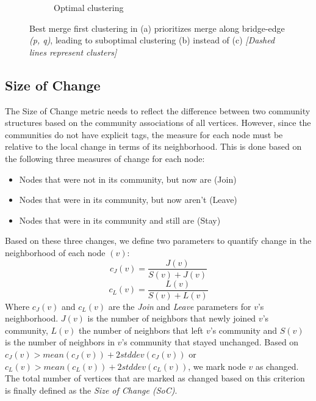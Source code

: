 \documentclass[conference]{IEEEtran}
\begin{document}
\begin{figure}
\begin{subfigure}{0.45\textwidth}
\caption{Optimal clustering} \label{wheel10o}
\end{subfigure}
\caption{\label{wheel10} Best merge first clustering in (a) prioritizes merge 
along bridge-edge \emph{(p, q)}, leading to suboptimal clustering (b) instead of 
(c) \emph{[Dashed lines represent clusters]}\vspace{-0.5cm}}
\end{figure}
\subsection{Size of Change}
The Size of Change metric needs to reflect the difference between two
 community structures based on the community associations of all vertices. 
However, since the communities do not have explicit tags, the measure for each 
node must be relative to the local change in terms of its neighborhood. This is 
done based on the following three measures of change for each node:
\begin{itemize}
 \item Nodes that were not in its community, but now are (Join)
 \item Nodes that were in its community, but now aren't (Leave)
 \item Nodes that were in its community and still are (Stay)
\end{itemize}
Based on these three changes, we define two parameters to quantify change in
the neighborhood of each node $(v)$:
\[c_J(v) = \frac{J(v)}{S(v) + J(v)}\]
\[c_L(v) = \frac{L(v)}{S(v) + L(v)}\]
Where $c_J(v)$ and $c_L(v)$ are the \emph{Join} and \emph{Leave} parameters
for $v$'s neighborhood. $J(v)$ is the number of neighbors that newly joined
$v$'s community, $L(v)$ the number of neighbors that left $v$'s community and 
$S(v)$ is the number of neighbors in $v$'s community that stayed unchanged. 
Based on $c_J(v) > mean(c_J(v)) + 2stddev(c_J(v))$ or $c_L(v) >
mean(c_L(v)) + 2stddev(c_L(v))$, we mark node $v$ as changed. The total number
of vertices that are marked as changed based on this criterion is finally
defined as the \emph{Size of Change (SoC)}.
\end{document}

